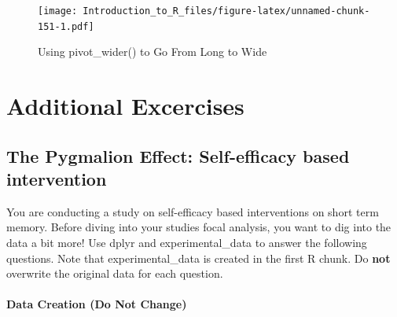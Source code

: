 \documentclass[]{book}
\theoremstyle{definition}
\theoremstyle{definition}
\theoremstyle{definition}
\theoremstyle{remark}
\begin{document}
\begin{figure}
\centering
\texttt{[image: Introduction\_to\_R\_files/figure-latex/unnamed-chunk-151-1.pdf]}
\caption{\label{fig:unnamed-chunk-151}Using pivot\_wider() to Go From Long to Wide}
\end{figure}

\hypertarget{part-additional-excercises}{%
\part{Additional Excercises}\label{part-additional-excercises}}

\hypertarget{the-pygmalion-effect-self-efficacy-based-intervention}{%
\chapter{The Pygmalion Effect: Self-efficacy based intervention}\label{the-pygmalion-effect-self-efficacy-based-intervention}}

You are conducting a study on self-efficacy based interventions on short term memory. Before diving into your studies focal analysis, you want to dig into the data a bit more! Use dplyr and experimental\_data to answer the following questions. Note that experimental\_data is created in the first R chunk. Do \textbf{not} overwrite the original data for each question.

\hypertarget{data-creation-do-not-change}{%
\subsection{Data Creation (Do Not Change)}\label{data-creation-do-not-change}}
\end{document}
